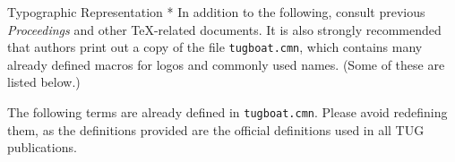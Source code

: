 \vskip5mm
 
\head * Typographic Representation *
In addition to the following, consult previous {\sl Proceedings\/} and
other \TeX-related documents. It is also strongly recommended that
authors print out a copy of the file {\tt tugboat.cmn}, which contains
many already defined macros for logos and commonly used names.
(Some of these are listed below.)
 
\medskip
 
 
\medskip
\noindent
The following terms are already defined in {\tt tugboat.cmn}.   Please
avoid redefining them, as the definitions provided are the official
definitions used in all TUG publications.

\medskip


